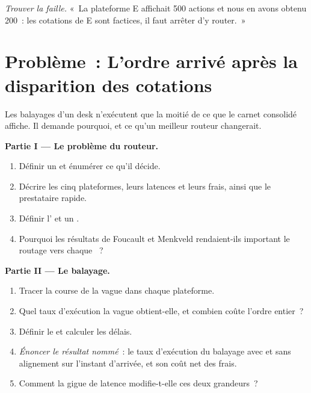 \begin{exercise}[$\star\star\star$]\label{exo:mx:smart-order-routing:8}
\emph{Trouver la faille.} «~La plateforme E affichait 500 actions et nous en avons obtenu 200~: les cotations de E sont factices, il faut arrêter d'y router.~»
\end{exercise}

\section{Problème~: L'ordre arrivé après la disparition des cotations}

\begin{problem}\label{pb:mx:smart-order-routing:1}
Les balayages d'un desk n'exécutent que la moitié de ce que le carnet consolidé affiche. Il demande pourquoi, et ce qu'un meilleur routeur changerait.

\medskip\noindent\textbf{Partie I --- Le problème du routeur.}
\begin{enumerate}
\item Définir un  et énumérer ce qu'il décide.
\item Décrire les cinq plateformes, leurs latences et leurs frais, ainsi que le prestataire rapide.
\item Définir l' et un .
\item Pourquoi les résultats de Foucault et Menkveld rendaient-ils important le routage vers chaque ~?
\end{enumerate}

\medskip\noindent\textbf{Partie II --- Le balayage.}
\begin{enumerate}[resume]
\item Tracer la course de la vague dans chaque plateforme.
\item Quel taux d'exécution la vague obtient-elle, et combien coûte l'ordre entier~?
\item Définir le  et calculer les délais.
\item \emph{Énoncer le résultat nommé}~: le taux d'exécution du balayage avec et sans alignement sur l'instant d'arrivée, et son coût net des frais.
\item Comment la gigue de latence modifie-t-elle ces deux grandeurs~?
\end{enumerate}


\end{problem}
